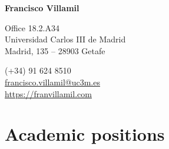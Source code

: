 \documentclass[a4paper, 12pt]{article}
\begin{document}

\begin{center}
{\bfseries\Large Francisco Villamil}
\end{center}

\vspace{0pt}

\noindent
\begin{minipage}[t]{0.47\textwidth}\small
\flushright
	Office 18.2.A34\\
	Universidad Carlos III de Madrid\\
	Madrid, 135 -- 28903 Getafe\\
\end{minipage}\hfill
\begin{minipage}[t]{0.47\textwidth}\small
	 \hspace{5pt} (+34) 91 624 8510\\
	 \hspace{5pt} \href{mailto:francisco.villamil@uc3m.es}{francisco.villamil@uc3m.es}\\
	 \hspace{5pt} \href{https://franvillamil.com}{https://franvillamil.com}\\
\end{minipage}


\section*{Academic positions}
\end{document}
